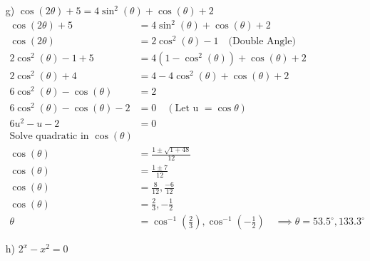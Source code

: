 \documentclass{article}
\newenvironment{solution}{\color{solutioncolor}}{}
\begin{document}
\begin{enumerate}
    \item[g)] $\cos(2\theta) + 5 = 4\sin^2(\theta) + \cos(\theta) + 2$
    \begin{solution}
        \begin{align*}
            \cos(2\theta) + 5 &= 4\sin^2(\theta) + \cos(\theta) + 2 \\
            \cos(2\theta) &= 2\cos^2(\theta) - 1 \quad \text{(Double Angle)} \\
            2\cos^2(\theta) - 1 + 5 &= 4(1 - \cos^2(\theta)) + \cos(\theta) + 2 \\
            2\cos^2(\theta) + 4 &= 4 - 4\cos^2(\theta) + \cos(\theta) + 2 \\
            6\cos^2(\theta) - \cos(\theta) &= 2 \\
            6\cos ^2(\theta)-\cos(\theta)-2&=0 \quad
            (\text{Let u } = \cos \theta)\\
            6u^2-u-2&=0\\
            \text{Solve quadratic in } \cos(\theta) \\
            \cos(\theta) &= \frac{1 \pm \sqrt{1 + 48}}{12} \\
            \cos(\theta) &= \frac{1 \pm 7}{12} \\
            \cos(\theta) &= \frac{8}{12}, \frac{-6}{12} \\
            \cos(\theta) &= \frac{2}{3}, -\frac{1}{2} \\
            \theta &= \cos^{-1}\left(\frac{2}{3}\right), \cos^{-1}\left(-\frac{1}{2}\right)\quad \implies
            \theta =53.5^{\circ}, 133.3^{\circ}
        \end{align*}
    \end{solution}
    
    \item[h)] $2^x - x^2 = 0$
    \begin{solution}
\begin{center}
\end{center}
\end{solution}
\end{enumerate}
\end{document}
